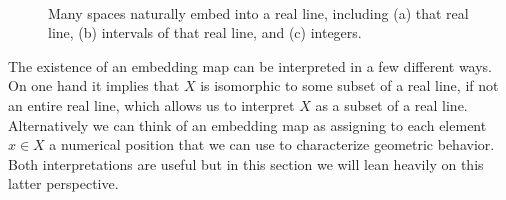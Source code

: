 \documentclass[
  letterpaper,
  DIV=11,
  numbers=noendperiod]{scrartcl}
\begin{document}
\begin{figure}
\begin{minipage}[t]{0.30\linewidth}
{{}

}

\subcaption{\label{fig-interval}}
\end{minipage}%
%
\begin{minipage}[t]{0.30\linewidth}

{\centering 


}

\subcaption{\label{fig-integer}}
\end{minipage}%
%
\begin{minipage}[t]{0.05\linewidth}

{\centering 

~

}

\end{minipage}%

\caption{\label{fig-integrate}Many spaces naturally embed into a real
line, including (a) that real line, (b) intervals of that real line, and
(c) integers.}

\end{figure}

The existence of an embedding map can be interpreted in a few different
ways. On one hand it implies that \(X\) is isomorphic to some subset of
a real line, if not an entire real line, which allows us to interpret
\(X\) as a subset of a real line. Alternatively we can think of an
embedding map as assigning to each element \(x \in X\) a numerical
position that we can use to characterize geometric behavior. Both
interpretations are useful but in this section we will lean heavily on
this latter perspective.
\end{document}
